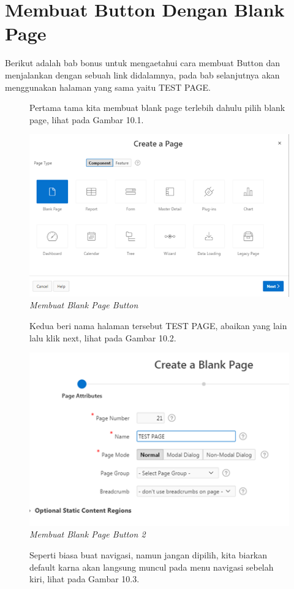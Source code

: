 \section{Membuat Button Dengan Blank Page}
Berikut adalah bab bonus untuk mengaetahui cara membuat Button dan menjalankan dengan sebuah link didalamnya, pada bab selanjutnya akan menggunakan halaman yang sama yaitu TEST PAGE.
\begin{enumerate}\begin{figure}
	\item Pertama tama kita membuat blank page terlebih dahulu pilih blank page, lihat pada Gambar 10.1.
	
        \centering
        \includegraphics[scale=0.5]{figures/bab10/1.png}
        \caption{\textit{Membuat Blank Page Button}}
        \label{Membuat Blank Page}
    \end{figure}
	\begin{figure}
	\item Kedua beri nama halaman tersebut TEST PAGE, abaikan yang lain lalu klik next, lihat pada Gambar 10.2.
	
        \centering
        \includegraphics[scale=0.55]{figures/bab10/2.png}
        \caption{\textit{Membuat Blank Page Button 2}}
        \label{Membuat Blank Page 2}
    \end{figure}
	\begin{figure}
	\item Seperti biasa buat navigasi, namun jangan dipilih, kita biarkan default karna akan langsung muncul pada menu navigasi sebelah kiri, lihat pada Gambar 10.3.
	

\end{figure}
\end{enumerate}

